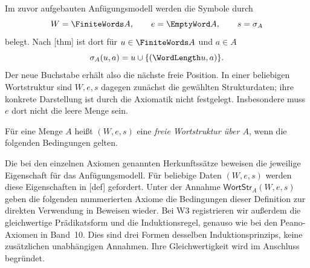 Im zuvor aufgebauten Anfügungsmodell werden die Symbole durch
\[
 W=\FiniteWords A,\qquad e=\EmptyWord A,\qquad s=\sigma_A
\]
belegt. Nach [thm] ist dort
für \(u\in\FiniteWords A\) und \(a\in A\)
\[
 \sigma_A(u,a)=u\cup\{(\WordLength u,a)\}.
\]
Der neue Buchstabe erhält also die nächste freie Position. In einer
beliebigen Wortstruktur sind \(W,e,s\) dagegen zunächst die gewählten
Strukturdaten; ihre konkrete Darstellung ist durch die Axiomatik nicht
festgelegt. Insbesondere muss \(e\) dort nicht die leere Menge sein.

Für eine Menge \(A\) heißt \((W,e,s)\) eine \emph{freie Wortstruktur über
\(A\)}, wenn die folgenden Bedingungen gelten.


Die bei den einzelnen Axiomen genannten Herkunftssätze beweisen die
jeweilige Eigenschaft für das Anfügungsmodell. Für beliebige Daten
\((W,e,s)\) werden diese Eigenschaften in
[def] gefordert. Unter der Annahme
\(\mathsf{WortStr}_A(W,e,s)\) geben die folgenden nummerierten Axiome
die Bedingungen dieser Definition zur direkten Verwendung in Beweisen
wieder. Bei W3 registrieren wir außerdem die gleichwertige Prädikatsform
und die Induktionsregel, genauso wie bei den Peano-Axiomen in Band~10.
Dies sind drei Formen desselben Induktionsprinzips, keine zusätzlichen
unabhängigen Annahmen. Ihre Gleichwertigkeit wird im Anschluss begründet.

